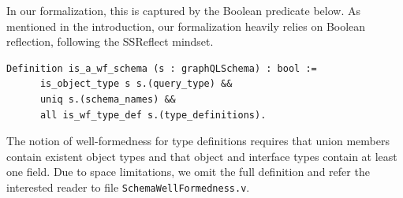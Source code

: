 In our \coq formalization, this is captured by the Boolean predicate below. As mentioned in the introduction, our formalization heavily relies on Boolean reflection, following the SSReflect mindset.
%
\begin{verbatim}
Definition is_a_wf_schema (s : graphQLSchema) : bool :=
      is_object_type s s.(query_type) &&
      uniq s.(schema_names) &&
      all is_wf_type_def s.(type_definitions).
\end{verbatim}
%
The notion of well-formedness for type definitions requires \eg that union members contain existent object types and that object and interface types contain at least one field. Due to space limitations, we omit the full definition and refer the interested reader to file \texttt{SchemaWellFormedness.v}.




